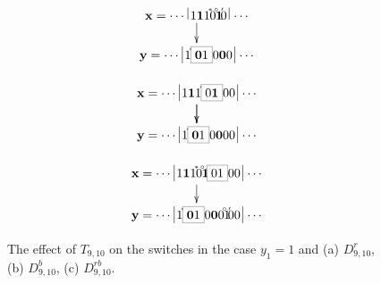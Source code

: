 \documentclass{sn-jnl}
\newcommand{\lllp}{\vline}
\newcommand{\bx}{\mathbf{x}}
\newcommand{\by}{\mathbf{y}}
\newcommand{\gn}[1]{\!^{{}^{{#1}}}\!\!}
\begin{document}
\begin{figure}[h!]
    \centering
    \begin{subfigure}{0.32\textwidth}
{\scriptsize\[
\xymatrix@C=0.2cm@R=0.5cm{ 
\bx = \cdots \;\lllp 1{\boldsymbol{1}}1\gn{*}0\gn{\circ}{\boldsymbol{1}}\gn{\prime}   0\,\lllp\,\cdots\ar[d]  \\
\by = \cdots \;\lllp 1 \gn{*}\fcolorbox{gray}{white}{{\bf{0}}1}0\boldsymbol{0}0  \,\lllp\,\cdots   
}
\]}
    \caption{}
    \label{fig:t9t10(a)}
\end{subfigure}
\hfill
 \begin{subfigure}{0.32\textwidth}
{\scriptsize\[
\xymatrix@C=0.2cm@R=0.5cm{ 
\bx = \cdots \;\lllp1{\boldsymbol{1}}1 \ar[d]  \gn{*}\fcolorbox{gray}{white}{{0\bf{1}}} 00\,\lllp\,\cdots\ar[d]  \\
\by = \cdots \;\lllp 1\gn{*}\fcolorbox{gray}{white}{{\bf{0}}1} 0{\boldsymbol{0}}00  \,\lllp\,\cdots 
}
\]}
    \caption{}
    \label{fig:t9t10(b)}
\end{subfigure}
\hfill
\begin{subfigure}{0.32\textwidth}
{\scriptsize\[
\xymatrix@C=0.2cm@R=0.5cm{ 
\bx = \cdots \;\lllp  1{\boldsymbol{1}}1\gn{*}0\gn{\circ}\boldsymbol{1}   \gn{\prime}\fcolorbox{gray}{white}{01} 00\,\lllp\,\cdots\ar[d]    \\
\by = \cdots \;\lllp 1\gn{*}\fcolorbox{gray}{white}{{\bf{0}}1} 0{\boldsymbol{0}}0\gn{\circ}1\gn{\prime}00  \,\lllp\,\cdots  
}
\]}
    \caption{}
    \label{fig:t9t10(c)} 
\end{subfigure}
\caption{The effect of $T_{9,10}$ on the switches in the case $y_1=1$ and
        (a) $D_{9,10}^r$, (b) $D_{9,10}^b$, (c) $D_{9,10}^{rb}$.}
\end{figure}
\end{document}
